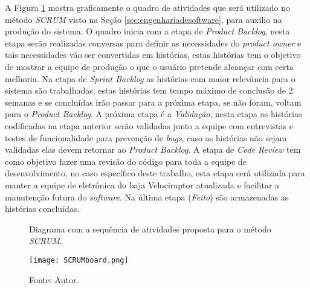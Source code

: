 A Figura \ref{fig:SCRUMboard} mostra graficamente o quadro de atividades que será utilizado no método \textit{SCRUM} visto na Seção \ref{sec:engenhariadesoftware}, para auxílio na produção do sistema. O quadro inicia com a etapa de \textit{Product Backlog}, nesta etapa serão realizadas conversas para definir as necessidades do \textit{product owner} e tais necessidades vão ser convertidas em histórias, estas histórias tem o objetivo de mostrar a equipe de produção o que o usuário pretende alcançar com certa melhoria. Na etapa de \textit{Sprint Backlog} as histórias com maior relevância para o sistema são trabalhadas, estas histórias tem tempo máximo de conclusão de 2 semanas e se concluídas irão passar para a próxima etapa, se não foram, voltam para o \textit{Product Backlog}. A próxima etapa é a \textit{Validação}, nesta etapa as histórias codificadas na etapa anterior serão validadas junto a equipe com entrevistas e testes de funcionalidade para prevenção de \textit{bugs}, caso as histórias não sejam validadas elas devem retornar ao \textit{Product Backlog}. A etapa de \textit{Code Review} tem como objetivo fazer uma revisão do código para toda a equipe de desenvolvimento, no caso específico deste trabalho, esta etapa será utilizada para manter a equipe de eletrônica do baja Velociraptor atualizada e facilitar a manutenção futura do \textit{software}. Na última etapa (\textit{Feito}) são armazenadas as histórias concluídas.    

\begin{figure}[!htb]
	\centering
		\caption{Diagrama com a sequência de atividades proposta para o método \textit{SCRUM}.}
		\texttt{[image: SCRUMboard.png]} 
		\caption*{Fonte: Autor.}
		\label{fig:SCRUMboard}
\end{figure} 
